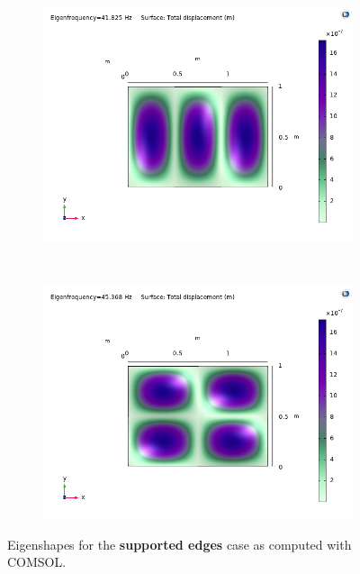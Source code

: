 \documentclass[a4paper]{article}
\begin{document}
\begin{figure}[h]
	\begin{subfigure}[b]{0.31\linewidth}
		\includegraphics[width=0.9\linewidth]{comsol/4ss.png}
	\end{subfigure}
	~
	\begin{subfigure}[b]{0.31\linewidth}
		\includegraphics[width=0.9\linewidth]{comsol/5ss.png}
	\end{subfigure}
	\caption{Eigenshapes for the \textbf{supported edges} case as computed with COMSOL.}
	\label{fig:ss_com}
\end{figure}
\end{document}
